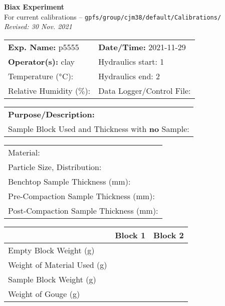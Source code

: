 \documentclass[letterpaper, 10pt]{article}
\begin{document}
\begin{center}
	{\Large \textbf{Biax Experiment}}\\
	{\small For current calibrations -- \texttt{gpfs/group/cjm38/default/Calibrations/}}\\
	{\footnotesize \textit{Revised: 30 Nov. 2021}}
\end{center}

\begin{table}[!ht]
	\renewcommand{\arraystretch}{1.1}
	\begin{tabular}{p{10cm} p{10cm} }
	    \textbf{Exp. Name: }p5555 & \textbf{Date/Time: }2021-11-29 \\
	    \textbf{Operator(s): }clay & Hydraulics start: 1 \\
	    Temperature ($\degree$C): & Hydraulics end: 2 \\
	    Relative Humidity ($\%$): & Data Logger/Control File: \\
	\end{tabular}
\end{table} \vspace{-0.5cm}

\begin{table}[!ht]
	\renewcommand{\arraystretch}{1.1}
	\begin{tabular}{p{20cm}}
	    \textbf{Purpose/Description:} \\
	    Sample Block Used and Thickness with \textbf{no} Sample: \\
	\end{tabular}
\end{table} \vspace{-0.5cm}


\begin{table}[!ht]
	\small
	\renewcommand{\arraystretch}{1.2}
	\begin{tabular}{ |p{7cm}| } \hline
	    Material: \\ 
	    Particle Size, Distribution: \\ 
	    Benchtop Sample Thickness (mm): \\ 
	    Pre-Compaction Sample Thickness (mm): \\ 
	    Post-Compaction Sample Thickness (mm): \\ \hline
	\end{tabular}
	\hfill
	\begin{tabular}{ |l|c|c| } \hline
	     & Block 1 & Block 2\\ \hline
	    Empty Block Weight (g) &  & \\ \hline
	    Weight of Material Used (g) &  & \\ \hline
	    Sample Block Weight (g) &  & \\ \hline
	    Weight of Gouge (g) &  & \\ \hline
	\end{tabular}
\end{table} \vspace{-0.5cm}
\end{document}
